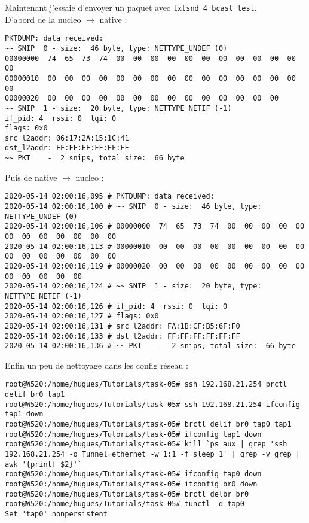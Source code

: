 Maintenant j'essaie d'envoyer un paquet avec
\texttt{txtsnd 4 bcast test}.\\

D’abord de la nucleo $\rightarrow$ native :
{\scriptsize
\begin{verbatim}
PKTDUMP: data received:
~~ SNIP  0 - size:  46 byte, type: NETTYPE_UNDEF (0)
00000000  74  65  73  74  00  00  00  00  00  00  00  00  00  00  00  00
00000010  00  00  00  00  00  00  00  00  00  00  00  00  00  00  00  00
00000020  00  00  00  00  00  00  00  00  00  00  00  00  00  00
~~ SNIP  1 - size:  20 byte, type: NETTYPE_NETIF (-1)
if_pid: 4  rssi: 0  lqi: 0
flags: 0x0
src_l2addr: 06:17:2A:15:1C:41
dst_l2addr: FF:FF:FF:FF:FF:FF
~~ PKT    -  2 snips, total size:  66 byte
\end{verbatim}
}
Puis de native $\rightarrow$ nucleo :
{\scriptsize
\begin{verbatim}
2020-05-14 02:00:16,095 # PKTDUMP: data received:
2020-05-14 02:00:16,100 # ~~ SNIP  0 - size:  46 byte, type: NETTYPE_UNDEF (0)
2020-05-14 02:00:16,106 # 00000000  74  65  73  74  00  00  00  00  00  00  00  00  00  00  00  00
2020-05-14 02:00:16,113 # 00000010  00  00  00  00  00  00  00  00  00  00  00  00  00  00  00  00
2020-05-14 02:00:16,119 # 00000020  00  00  00  00  00  00  00  00  00  00  00  00  00  00
2020-05-14 02:00:16,124 # ~~ SNIP  1 - size:  20 byte, type: NETTYPE_NETIF (-1)
2020-05-14 02:00:16,126 # if_pid: 4  rssi: 0  lqi: 0
2020-05-14 02:00:16,127 # flags: 0x0
2020-05-14 02:00:16,131 # src_l2addr: FA:1B:CF:B5:6F:F0
2020-05-14 02:00:16,133 # dst_l2addr: FF:FF:FF:FF:FF:FF
2020-05-14 02:00:16,136 # ~~ PKT    -  2 snips, total size:  66 byte
\end{verbatim}
}
Enfin un peu de nettoyage dans les config réseau :
{\tiny
\begin{verbatim}
root@W520:/home/hugues/Tutorials/task-05# ssh 192.168.21.254 brctl delif br0 tap1
root@W520:/home/hugues/Tutorials/task-05# ssh 192.168.21.254 ifconfig tap1 down
root@W520:/home/hugues/Tutorials/task-05# brctl delif br0 tap0 tap1
root@W520:/home/hugues/Tutorials/task-05# ifconfig tap1 down
root@W520:/home/hugues/Tutorials/task-05# kill `ps aux | grep 'ssh 192.168.21.254 -o Tunnel=ethernet -w 1:1 -f sleep 1' | grep -v grep | awk '{printf $2}'`
root@W520:/home/hugues/Tutorials/task-05# ifconfig tap0 down
root@W520:/home/hugues/Tutorials/task-05# ifconfig br0 down
root@W520:/home/hugues/Tutorials/task-05# brctl delbr br0
root@W520:/home/hugues/Tutorials/task-05# tunctl -d tap0
Set 'tap0' nonpersistent
\end{verbatim}
}

